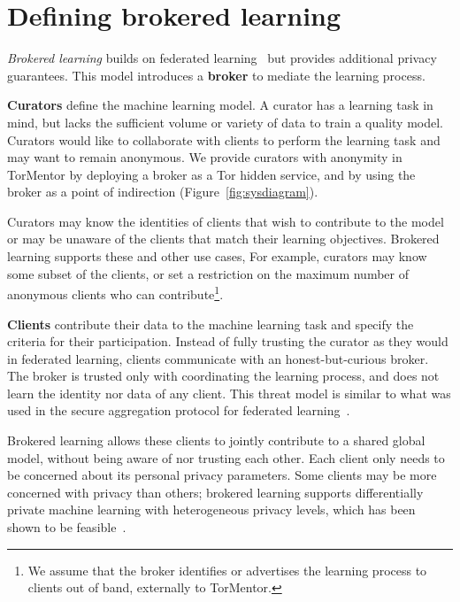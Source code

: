\section{Defining brokered learning}

\emph{Brokered learning} builds on federated 
learning~\cite{McMahan:2017} but provides additional privacy
guarantees. This model introduces a \textbf{broker} to mediate the
learning process. 

\textbf{Curators} define the machine learning model. A curator has a
learning task in mind, but lacks the sufficient volume or variety of
data to train a quality model. Curators would like to collaborate with
clients to perform the learning task and may want to remain
anonymous. We provide curators with anonymity in TorMentor by
deploying a broker as a Tor hidden service, and by using the broker
as a point of indirection (Figure~\ref{fig:sysdiagram}).


Curators may know the identities of clients that wish to contribute to
the model or may be unaware of the clients that match their learning
objectives. Brokered learning supports these and other use cases, For
example, curators may know some subset of the clients, or set a
restriction on the maximum number of anonymous clients who can
contribute\footnote{We assume that the broker identifies or advertises
the learning process to clients out of band, externally to TorMentor.}.

\textbf{Clients} contribute their data to the machine learning task
and specify the criteria for their participation. Instead of fully
trusting the curator as they would in federated learning, clients
communicate with an honest-but-curious broker. The broker is trusted
only with coordinating the learning process, and does not learn the
identity nor data of any client. This threat model is similar to what
was used in the secure aggregation protocol for federated 
learning~\cite{Bonawitz:2017}.

Brokered learning allows these clients to jointly contribute to a
shared global model, without being aware of nor trusting each other.
Each client only needs to be concerned about its personal privacy
parameters. Some clients may be more concerned with privacy than
others; brokered learning supports differentially private
machine learning with heterogeneous privacy levels, which has been
shown to be feasible~\cite{Geyer:2017}. 

